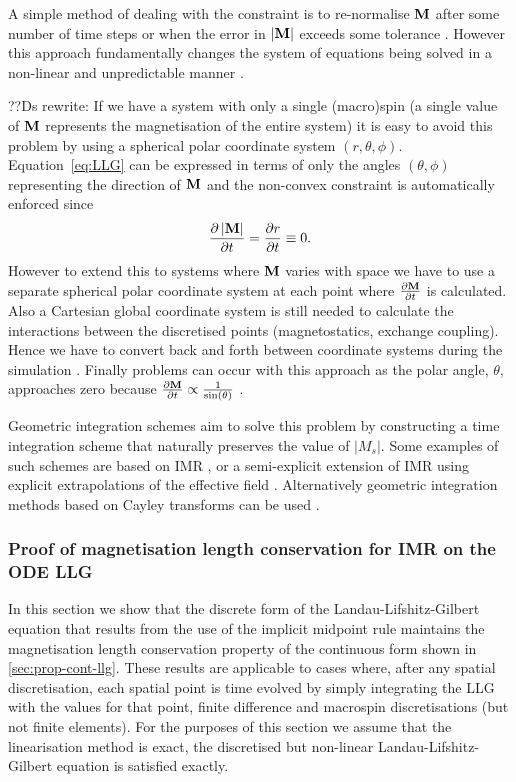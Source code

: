 A simple method of dealing with the constraint is to re-normalise $\mathbf{M}$ after some number of time steps or when the error in $|\mathbf{M}|$ exceeds some tolerance \cite{Fidler2000}.
However this approach fundamentally changes the system of equations being solved in a non-linear and unpredictable manner \cite{Lewis2003}.

??Ds rewrite:
If we have a system with only a single (macro)spin (\ie a single value of $\mathbf{M}$ represents the magnetisation of the entire system) it is easy to avoid this problem by using a spherical polar coordinate system $(r,\theta,\phi)$.
Equation~\cref{eq:LLG} can be expressed in terms of only the angles $(\theta,\phi)$ representing the direction of $\mathbf{M}$ and the non-convex constraint is automatically enforced since
\begin{equation}
  \label{eq:40}
  \frac{\partial \left|{\mathbf{M}} \right|}{\partial t} = \frac{\partial r}{\partial t} \equiv 0.
\end{equation}
However to extend this to systems where $\mathbf{M}$ varies with space we have to use a separate spherical polar coordinate system at each point where $\frac{\partial \mathbf{M}}{\partial t}$ is calculated.
Also a Cartesian global coordinate system is still needed to calculate the interactions between the discretised points (\ie magnetostatics, exchange coupling).
Hence we have to convert back and forth between coordinate systems during the simulation \cite{Scholz2003}.
Finally problems can occur with this approach as the polar angle, $\theta$, approaches zero because $\frac{\partial \mathbf{M}}{\partial t} \propto \frac{1}{\sin(\theta)}$ \cite{Fukushima2005}.

Geometric integration schemes aim to solve this problem by constructing a time integration scheme that naturally preserves the value of $|M_s|$.
Some examples of such schemes are based on IMR \cite{DAquino2005}, or a semi-explicit extension of IMR using explicit extrapolations of the effective field \cite{Spargo2003} \cite{Serpico2001}.
Alternatively geometric integration methods based on Cayley transforms can be used \cite{Lewis2003} \cite{Bottauscio2011}.


\subsubsection{Proof of magnetisation length conservation for IMR on the ODE LLG}
\label{sec:proof-magn-length-ode-imr-llg}

In this section we show that the discrete form of the Landau-Lifshitz-Gilbert equation that results from the use of the implicit midpoint rule maintains the magnetisation length conservation property of the continuous form shown in \cref{sec:prop-cont-llg}.
These results are applicable to cases where, after any spatial discretisation, each spatial point is time evolved by simply integrating the LLG with the values for that point, \ie finite difference and macrospin discretisations (but not finite elements).
For the purposes of this section we assume that the linearisation method is exact, \ie the discretised but non-linear Landau-Lifshitz-Gilbert equation is satisfied exactly.

